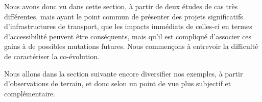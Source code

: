 \stars


Nous avons donc vu dans cette section, à partir de deux études de cas très différentes, mais ayant le point commun de présenter des projets significatifs d'infrastructures de transport, que les impacts immédiats de celles-ci en termes d'accessibilité peuvent être conséquents, mais qu'il est compliqué d'associer ces gains à de possibles mutations futures. Nous commençons à entrevoir la difficulté de caractériser la co-évolution.


Nous allons dans la section suivante encore diversifier nos exemples, à partir d'observations de terrain, et donc selon un point de vue plus subjectif et complémentaire.



\stars









